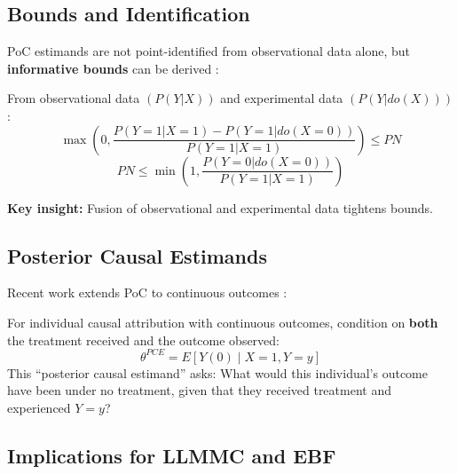 \subsection{Bounds and Identification}

PoC estimands are not point-identified from observational data alone, but
\textbf{informative bounds} can be derived \citep{tian2000probabilities}:

\begin{tcolorbox}[colback=green!5!white, colframe=green!75!black,
    title=Tian-Pearl Bounds on PN]

From observational data $(P(Y|X))$ and experimental data $(P(Y|do(X)))$:
\[
\max\left(0, \frac{P(Y=1|X=1) - P(Y=1|do(X=0))}{P(Y=1|X=1)}\right) \leq PN
\]
\[
PN \leq \min\left(1, \frac{P(Y=0|do(X=0))}{P(Y=1|X=1)}\right)
\]

\textbf{Key insight:} Fusion of observational and experimental data tightens bounds.
\end{tcolorbox}

\subsection{Posterior Causal Estimands}

Recent work extends PoC to continuous outcomes \citep{luo2025attribution}:

\begin{tcolorbox}[colback=blue!5!white, colframe=blue!75!black,
    title=Axiom UNMAPPED_CAL-7: Posterior Causal Attribution (Luo-Geng Criterion)]
For individual causal attribution with continuous outcomes, condition on
\textbf{both} the treatment received and the outcome observed:
\[
\theta^{PCE} = E[Y(0) \mid X = 1, Y = y]
\]
This ``posterior causal estimand'' asks: What would this individual's outcome
have been under no treatment, given that they received treatment and experienced $Y=y$?
\end{tcolorbox}

\subsection{Implications for LLMMC and EBF}

